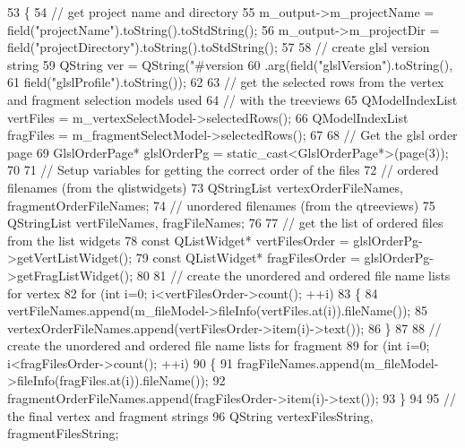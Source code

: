 \begin{DoxyCode}
53 \{
54   \textcolor{comment}{// get project name and directory}
55   m_output->m_projectName = field(\textcolor{stringliteral}{"projectName"}).toString().toStdString();
56   m_output->m_projectDir = field(\textcolor{stringliteral}{"projectDirectory"}).toString().toStdString();
57 
58   \textcolor{comment}{// create glsl version string}
59   QString ver = QString(\textcolor{stringliteral}{"#version %
60                 .arg(field(\textcolor{stringliteral}{"glslVersion"}).toString(),
61                      field(\textcolor{stringliteral}{"glslProfile"}).toString());
62 
63   \textcolor{comment}{// get the selected rows from the vertex and fragment selection models used}
64   \textcolor{comment}{// with the treeviews}
65   QModelIndexList vertFiles = m_vertexSelectModel->selectedRows();
66   QModelIndexList fragFiles = m_fragmentSelectModel->selectedRows();
67 
68   \textcolor{comment}{// Get the glsl order page}
69   GlslOrderPage* glslOrderPg = \textcolor{keyword}{static\_cast<}GlslOrderPage*\textcolor{keyword}{>}(page(3));
70 
71   \textcolor{comment}{// Setup variables for getting the correct order of the files}
72   \textcolor{comment}{// ordered filenames (from the qlistwidgets)}
73   QStringList vertexOrderFileNames, fragmentOrderFileNames;
74   \textcolor{comment}{// unordered filenames (from the qtreeviews)}
75   QStringList vertFileNames, fragFileNames;
76 
77   \textcolor{comment}{// get the list of ordered files from the list widgets}
78   \textcolor{keyword}{const} QListWidget* vertFilesOrder = glslOrderPg->getVertListWidget();
79   \textcolor{keyword}{const} QListWidget* fragFilesOrder = glslOrderPg->getFragListWidget();
80 
81   \textcolor{comment}{// create the unordered and ordered file name lists for vertex}
82   \textcolor{keywordflow}{for} (\textcolor{keywordtype}{int} i=0; i<vertFilesOrder->count(); ++i)
83   \{
84     vertFileNames.append(m_fileModel->fileInfo(vertFiles.at(i)).fileName());
85     vertexOrderFileNames.append(vertFilesOrder->item(i)->text());
86   \}
87 
88   \textcolor{comment}{// create the unordered and ordered file name lists for fragment}
89   \textcolor{keywordflow}{for} (\textcolor{keywordtype}{int} i=0; i<fragFilesOrder->count(); ++i)
90   \{
91     fragFileNames.append(m_fileModel->fileInfo(fragFiles.at(i)).fileName());
92     fragmentOrderFileNames.append(fragFilesOrder->item(i)->text());
93   \}
94 
95   \textcolor{comment}{// the final vertex and fragment strings}
96   QString vertexFilesString, fragmentFilesString;
}
\end{DoxyCode}
